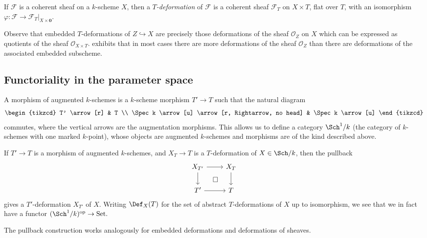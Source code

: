 \begin{definition} \label{def-defthy-of-sheaf}
    If \(\mathcal{F}\) is a coherent sheaf on a \(k\)-scheme \(X\), then a
    \textit{\(T\)-deformation} of \(\mathcal{F}\) is a coherent sheaf
    \(\mathcal{F}_T\) on \(X\times T\), flat over \(T\), with an isomorphism
    \(\varphi: \mathcal{F}\rightarrow\mathcal{F}_T|_{X\times \mathbold{0}}\).
\end{definition}

Observe that embedded \(T\)-deformations of \(Z\hookrightarrow X\) are
precisely those deformations of the sheaf \(\mathscr{O}_Z\) on \(X\) which can
be expressed as quotients of the sheaf \(\mathscr{O}_{X\times T}\).
 exhibits that in most cases there are more
deformations of the sheaf \(\mathscr{O}_Z\) than there are deformations of the
associated embedded subscheme. 

\subsection{Functoriality in the parameter space}

A morphism of augmented \(k\)-schemes is a \(k\)-scheme morphism \(T'\rightarrow
T\) such that the natural diagram 
\[\begin{tikzcd}
    T' \arrow[r] & T \\
    \Spec k \arrow[u] \arrow[r, Rightarrow, no head] & \Spec k \arrow[u]
\end{tikzcd}\]
commutes, where the vertical arrows are the augmentation morphisms. This allows
us to define a category \(\Sch^1/k\) (the category of \(k\)-schemes with one
marked \(k\)-point), whose objects are augmented \(k\)-schemes and morphisms are
of the kind described above.

If \(T'\rightarrow T\) is a morphism of augmented \(k\)-schemes, and
\(X_T\rightarrow T\) is a \(T\)-deformation of \(X\in \Sch/k\), then the
pullback
\[ \begin{tikzcd}
    X_{T'} \arrow[r] \arrow[d] \arrow[dr, phantom, "\square"] & X_T
    \arrow[d] \\ 
    T' \arrow[r] & T 
\end{tikzcd} \]
gives a \(T'\)-deformation \(X_{T'}\) of \(X\). Writing \(\Def_X(T)\) for the
set of abstract \(T\)-deformations of \(X\) up to isomorphism, we see that we
in fact have a functor \((\Sch^1/k)^\text{op}\rightarrow \text{Set}.\)

The pullback construction works analogously for embedded deformations and
deformations of sheaves.

